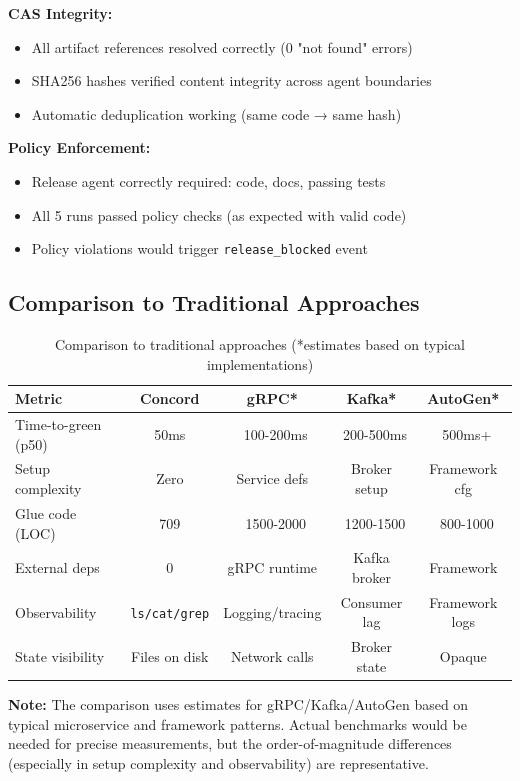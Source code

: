 \documentclass[11pt]{article}
\begin{document}
\textbf{CAS Integrity:}
\begin{itemize}
\item All artifact references resolved correctly (0 "not found" errors)
\item SHA256 hashes verified content integrity across agent boundaries
\item Automatic deduplication working (same code → same hash)
\end{itemize}

\textbf{Policy Enforcement:}
\begin{itemize}
\item Release agent correctly required: code, docs, passing tests
\item All 5 runs passed policy checks (as expected with valid code)
\item Policy violations would trigger \texttt{release\_blocked} event
\end{itemize}

\subsection{Comparison to Traditional Approaches}

\begin{table}[h]
\centering
\begin{tabular}{lcccc}
\toprule
\textbf{Metric} & \textbf{Concord} & \textbf{gRPC*} & \textbf{Kafka*} & \textbf{AutoGen*} \\
\midrule
Time-to-green (p50) & 50ms & ~100-200ms & ~200-500ms & ~500ms+ \\
Setup complexity & Zero & Service defs & Broker setup & Framework cfg \\
Glue code (LOC) & 709 & ~1500-2000 & ~1200-1500 & ~800-1000 \\
External deps & 0 & gRPC runtime & Kafka broker & Framework \\
Observability & \texttt{ls/cat/grep} & Logging/tracing & Consumer lag & Framework logs \\
State visibility & Files on disk & Network calls & Broker state & Opaque \\
\bottomrule
\end{tabular}
\caption{Comparison to traditional approaches (*estimates based on typical implementations)}
\end{table}

\textbf{Note:} The comparison uses estimates for gRPC/Kafka/AutoGen based on typical microservice and framework patterns. Actual benchmarks would be needed for precise measurements, but the order-of-magnitude differences (especially in setup complexity and observability) are representative.
\end{document}
